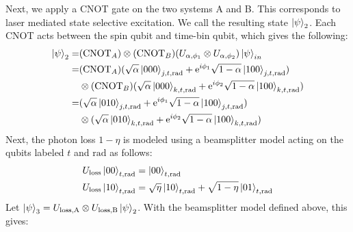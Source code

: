 Next, we apply a CNOT gate on the two systems A and B. This corresponds to laser mediated state selective excitation.  We call the resulting state $\ket{\psi}_{2}$. Each CNOT acts between the spin qubit and time-bin qubit, which gives the following:
\begin{subequations}
    \begin{align}
        \ket{\psi}_{2} =& (\text{CNOT}_{A})\otimes (\text{CNOT}_{B})(U_{\alpha,\phi_{1}}\otimes U_{\alpha,\phi_{2}})\ket{\psi}_{in}\\
        =& (\text{CNOT}_{A})(\sqrt{\alpha}\ket{000}_{j,t,\text{rad}} + \text{e}^{i\phi_{1}}\sqrt{1-\alpha}\ket{100}_{j,t,\text{rad}})\nonumber\\
        &\otimes (\text{CNOT}_{B})(\sqrt{\alpha}\ket{000}_{k,t,\text{rad}} + \text{e}^{i\phi_{2}}\sqrt{1-\alpha}\ket{100}_{k,t,\text{rad}})\\
        =& (\sqrt{\alpha}\ket{010}_{j,t,\text{rad}} + \text{e}^{i\phi_{1}}\sqrt{1-\alpha}\ket{100}_{j,t,\text{rad}})\nonumber\\
        &\otimes(\sqrt{\alpha}\ket{010}_{k,t,\text{rad}} + \text{e}^{i\phi_{2}}\sqrt{1-\alpha}\ket{100}_{k,t,\text{rad}})
    \end{align}
\end{subequations}
Next, the photon loss \(1-\eta\) is modeled using a beamsplitter model acting on the qubits labeled $t$ and $\text{rad}$ as follows:
\begin{subequations}
\begin{align}
    U_{\text{loss}}\ket{00}_{t,\text{rad}} &= \ket{00}_{t,\text{rad}}\\
     U_{\text{loss}}\ket{10}_{t,\text{rad}} &= \sqrt{\eta}\ket{10}_{t,\text{rad}} + \sqrt{1-\eta}\ket{01}_{t,\text{rad}}
\end{align}
\end{subequations}
Let $\ket{\psi}_{3}=U_{\text{loss,A}}\otimes U_{\text{loss,B}}\ket{\psi}_2$. With the beamsplitter model defined above, this gives:
